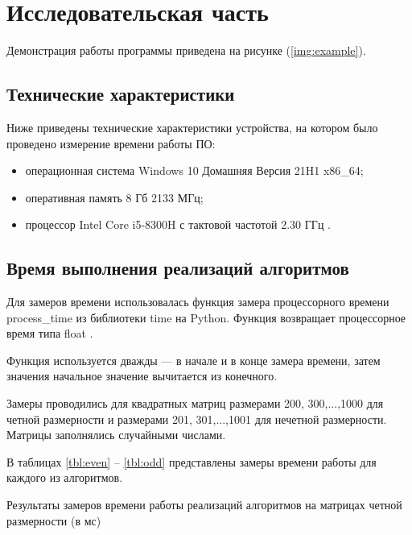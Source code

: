 \chapter{Исследовательская часть}

	Демонстрация работы программы приведена на рисунке (\ref{img:example}).

\section{Технические характеристики}

Ниже приведены технические характеристики устройства, на котором было проведено измерение времени работы ПО:

\begin{itemize}
	\item операционная система Windows 10 Домашняя Версия 21H1 \cite{windows} x86\_64;
	\item оперативная память 8 Гб 2133 МГц;
	\item процессор Intel Core i5-8300H с тактовой частотой 2.30 ГГц \cite{intel}.
\end{itemize}

\section{Время выполнения реализаций алгоритмов}

Для замеров времени использовалась функция замера процессорного времени process\_time из библиотеки time на Python. Функция возвращает процессорное время типа float \cite{time}.

Функция используется дважды --- в начале и в конце замера времени, затем значения начальное значение вычитается из конечного.

Замеры проводились для квадратных матриц размерами {200, 300,...,1000} для четной размерности и размерами {201, 301,...,1001} для нечетной размерности.
Матрицы заполнялись случайными числами.

В таблицах \ref{tbl:even} -- \ref{tbl:odd} представлены замеры времени работы для каждого из алгоритмов.


\begin{table}[h]
	\centering
	\caption{Результаты замеров времени работы реализаций алгоритмов на матрицах четной размерности (в мс)}
	\label{tbl:even}
\end{table}

